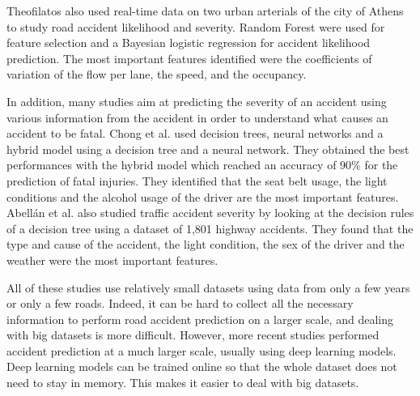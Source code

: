 \documentclass[conference]{IEEEtran}
\begin{document}
Theofilatos\cite{Theofilatos2017} also used
real-time data on two urban arterials of the city of Athens to study road
accident likelihood and severity. Random Forest were used for feature
selection and a Bayesian logistic regression for accident likelihood
prediction. The most important features identified were the coefficients of
variation of the flow per lane, the speed, and the occupancy.

In addition, many
studies aim at predicting the severity of an accident using various
information from the accident in order to understand what causes an
accident to be fatal. Chong et al.\cite{Chong2005} used decision trees,
neural networks and a hybrid model using a decision tree and a neural
network. They obtained the best performances with the hybrid model which
reached an accuracy of $90\%$ for the prediction of fatal injuries. They
identified that the seat belt usage, the light conditions and the alcohol
usage of the driver are the most important features. Abellán et al.
\cite{Abellan2013} also studied traffic accident severity by looking at the
decision rules of a decision tree using a dataset of 1,801 highway
accidents. They found that the type and cause of the accident, the light
condition, the sex of the driver and the weather were the most important
features.

All of these studies use relatively small datasets using data from only a
few years or only a few roads. Indeed, it can be hard to collect all the
necessary information to perform road accident prediction on a larger
scale, and dealing with big datasets is more difficult. However, more
recent studies \cite{QChen2016, Najjar2017, Yuan2018} performed accident prediction at a much larger scale,
usually using deep learning models. Deep learning models can be trained
online so that the whole dataset does not need to stay in memory. This
makes it easier to deal with big datasets.
\end{document}

